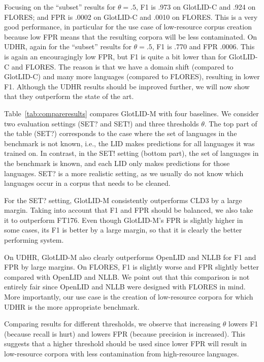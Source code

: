 \documentclass[11pt]{article}
\newcommand{\basequ}{SET?\xspace}
\newcommand{\baseex}{SET!\xspace}
\def\modelname{\mbox{GlotLID-M}\xspace}
\def\corpusname{\mbox{GlotLID-C}\xspace}
\def\flores{FLORES\xspace}
\def\udhr{UDHR\xspace}
\def\ft176{FT176\xspace}
\def\edin{OpenLID\xspace}
\def\nllb{NLLB\xspace}
\def\tabref#1{Table~\ref{tab:#1}}
\begin{document}
Focusing on the ``subset'' results for $\theta =.5$,
F1 is .973 on \corpusname and .924 on \flores; and FPR is
.0002 on \corpusname and .0010 on \flores. This is a very good
performance, in particular for the use case of low-resource
corpus creation because low FPR means that the
resulting corpora will be less contaminated. 
 On \udhr, again for the ``subset'' results for $\theta =.5$, F1 is
.770 and FPR .0006. This is again an encouragingly low FPR,
but F1 is quite a bit lower than for \corpusname
and \flores. The reason is that we have a domain shift
(compared to \corpusname) and many more languages (compared
to \flores), resulting in lower F1. Although the \udhr
results should be improved further, we will now show that
they outperform the state of the art.


\tabref{compareresults} compares \modelname with four baselines.
We consider two evaluation settings
(\basequ and \baseex)
and three thresholds $\theta$.
The top part of the table (\basequ) corresponds to the
case where the set  of languages in the benchmark is not known,
i.e., the LID makes predictions for all languages it was
trained on.
In contrast, in the
\baseex setting (bottom part), the set of languages in the
benchmark is known, and
each LID only makes predictions for those languages.
\basequ is a more realistic setting, as we usually do not know which
languages occur in a corpus that needs to be cleaned.

For the \basequ setting, \modelname consistently outperforms
CLD3 by a large margin. Taking into account that F1 and FPR
should be balanced, we also take it to outperform \ft176.
Even though \modelname's FPR is slightly higher in some
cases, its F1 is better by a large margin, so
that it is clearly the better performing system.

On \udhr, \modelname also clearly outperforms \edin
and \nllb for F1 and FPR by large margins. On \flores, F1 is
slightly worse and FPR slightly better compared with \edin
and \nllb.
We point out that this comparison is not entirely
fair since \edin and \nllb were designed with \flores in
mind. More
importantly, our use case is the creation of low-resource
corpora for which \udhr is the more appropriate benchmark.

Comparing results for different
thresholds, we observe
that increasing $\theta$  lowers F1 (because
recall is hurt) and lowers FPR (because precision is increased).
This suggests that a higher threshold should be used since
lower FPR will result in low-resource corpora with less
contamination from high-resource languages.
\end{document}
